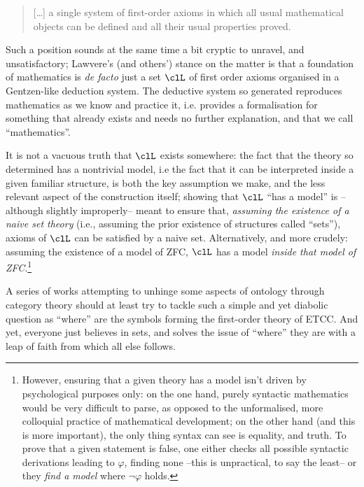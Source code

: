 \begin{quote}
	[\dots\unkern] a single system of first-order axioms in which all usual mathematical objects can be defined and all their usual properties proved.
\end{quote}
Such a position sounds at the same time a bit cryptic to unravel, and unsatisfactory; Lawvere's (and others') stance on the matter is that a foundation of mathematics is \emph{de facto} just a set $\clL$ of first order axioms organised in a Gentzen-like deduction system. The deductive system so generated reproduces mathematics as we know and practice it, i.e. provides a formalisation for something that already exists and needs no further explanation, and that we call ``mathematics''.

It is not a vacuous truth that $\clL$ exists somewhere: the fact that the theory so determined has a nontrivial model, i.e the fact that it can be interpreted inside a given familiar structure, is both the key assumption we make, and the less relevant aspect of the construction itself; showing that $\clL$ ``has a model'' is --although slightly improperly-- meant to ensure that, \emph{assuming the existence of a naive set theory} (i.e., assuming the prior existence of structures called ``sets''), axioms of $\clL$ can be satisfied by a naive set. Alternatively, and more crudely: assuming the existence of a model of ZFC, $\clL$ has a model \emph{inside that model of ZFC}.\footnote{However, ensuring that a given theory has a model isn't driven by psychological purposes only: on the one hand, purely syntactic mathematics would be very difficult to parse, as opposed to the unformalised, more colloquial practice of mathematical development; on the other hand (and this is more important), the only thing syntax can see is equality, and truth. To prove that a given statement is false, one either checks all possible syntactic derivations leading to $\varphi$, finding none --this is unpractical, to say the least-- or they \emph{find a model} where $\lnot\varphi$ holds.}

A series of works attempting to unhinge some aspects of ontology through category theory should at least try to tackle such a simple and yet diabolic question as ``where'' are the symbols forming the first-order theory of ETCC. And yet, everyone just believes in sets, and solves the issue of ``where'' they are with a leap of faith from which all else follows.

